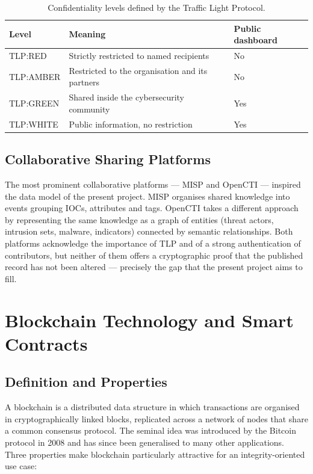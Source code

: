 \documentclass[12pt,a4paper,oneside]{book}
\begin{document}
{{\begin{table}[!h]
\caption{Confidentiality levels defined by the Traffic Light Protocol.}
\label{tab:tlp}
\centering
\renewcommand{\arraystretch}{1.4}
\begin{tabular}{| C{.15\textwidth} | p{.55\textwidth} | C{.15\textwidth} |}
\hline
\textbf{Level} & \textbf{Meaning} & \textbf{Public dashboard} \\
\hline\hline
TLP:RED   & \nohyphens{Strictly restricted to named recipients} & No \\
\hline
TLP:AMBER & \nohyphens{Restricted to the organisation and its partners} & No \\
\hline
TLP:GREEN & \nohyphens{Shared inside the cybersecurity community} & Yes \\
\hline
TLP:WHITE & \nohyphens{Public information, no restriction} & Yes \\
\hline
\end{tabular}
\end{table}

\subsection{Collaborative Sharing Platforms}

The most prominent collaborative platforms --- MISP and OpenCTI --- inspired
the data model of the present project. MISP organises shared knowledge into
events grouping IOCs, attributes and tags. OpenCTI takes a different
approach by representing the same knowledge as a graph of entities (threat
actors, intrusion sets, malware, indicators) connected by semantic
relationships. Both platforms acknowledge the importance of TLP and of a
strong authentication of contributors, but neither of them offers a
cryptographic proof that the published record has not been altered ---
precisely the gap that the present project aims to fill.

\section{Blockchain Technology and Smart Contracts}

\subsection{Definition and Properties}

A blockchain is a distributed data structure in which transactions are
organised in cryptographically linked blocks, replicated across a network
of nodes that share a common consensus protocol. The seminal idea was
introduced by the Bitcoin protocol in 2008 and has since been generalised
to many other applications. Three properties make blockchain particularly
attractive for an integrity-oriented use case:

}}
\end{document}

